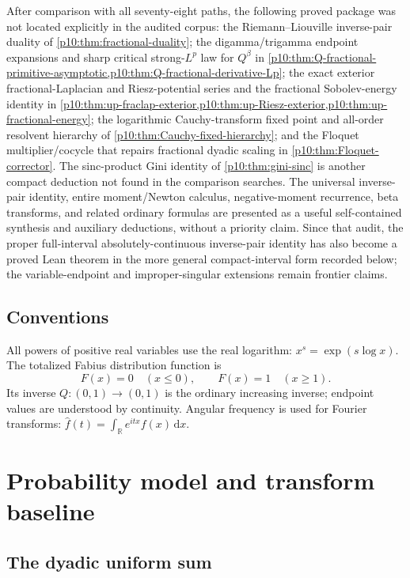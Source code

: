 \documentclass[11pt,oneside]{article}
\theoremstyle{definition}
\theoremstyle{remark}
\newcommand{\F}{F}
\newcommand{\Q}{Q}
\newcommand{\R}{\mathbb R}
\newcommand{\dd}{\,\mathrm d}
\newcommand{\1}{\mathbf 1}
\begin{document}
\begin{resultbox}
After comparison with all seventy-eight paths, the following proved package was not located
explicitly in the audited corpus: the Riemann--Liouville inverse-pair duality of
\cref{p10:thm:fractional-duality}; the digamma/trigamma endpoint expansions and sharp critical
strong-\(L^p\) law for \(\Q^\beta\) in
\cref{p10:thm:Q-fractional-primitive-asymptotic,p10:thm:Q-fractional-derivative-Lp}; the exact
exterior fractional-Laplacian and Riesz-potential series and the fractional Sobolev-energy
identity in \cref{p10:thm:up-fraclap-exterior,p10:thm:up-Riesz-exterior,p10:thm:up-fractional-energy};
the logarithmic Cauchy-transform fixed point and all-order resolvent hierarchy of
\cref{p10:thm:Cauchy-fixed-hierarchy}; and the Floquet multiplier/cocycle that repairs
fractional dyadic scaling in \cref{p10:thm:Floquet-corrector}.  The sinc-product Gini identity
of \cref{p10:thm:gini-sinc} is another compact deduction not found in the comparison searches.
The universal inverse-pair identity, entire moment/Newton calculus, negative-moment
recurrence, beta transforms, and related ordinary formulas are presented as a useful
self-contained synthesis and auxiliary deductions, without a priority claim.
Since that audit, the proper full-interval absolutely-continuous inverse-pair identity has
also become a proved Lean theorem in the more general compact-interval form recorded
below; the variable-endpoint and improper-singular extensions remain frontier claims.
\end{resultbox}

\subsection{Conventions}

All powers of positive real variables use the real logarithm:
\(x^s=\exp(s\log x)\).  The totalized Fabius distribution function is
\[
 \F(x)=0\quad(x\le0),\qquad \F(x)=1\quad(x\ge1).
\]
Its inverse \(\Q:(0,1)\to(0,1)\) is the ordinary increasing inverse; endpoint values
are understood by continuity.  Angular frequency is used for Fourier transforms:
\(\widehat f(t)=\int_\R e^{itx}f(x)\dd x\).

\section{Probability model and transform baseline}

\subsection{The dyadic uniform sum}
\end{document}
